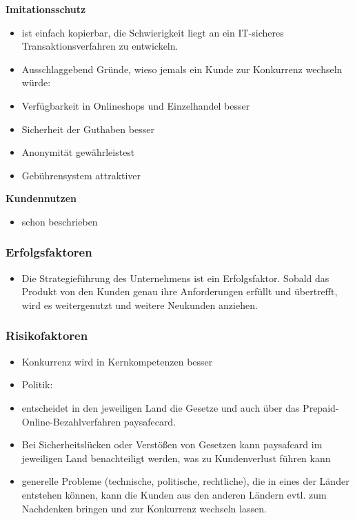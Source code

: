 \textbf{Imitationsschutz}
\begin{itemize}
        \item ist einfach kopierbar, die Schwierigkeit liegt an ein IT-sicheres Transaktionsverfahren zu entwickeln.
        \item Ausschlaggebend Gründe, wieso jemals ein Kunde zur Konkurrenz wechseln würde:
        \item   Verfügbarkeit in Onlineshops und Einzelhandel besser
        \item   Sicherheit der Guthaben besser
        \item   Anonymität gewährleistest
        \item   Gebührensystem attraktiver
\end{itemize}

\textbf{Kundennutzen}
\begin{itemize}
        \item schon beschrieben

\end{itemize}



\subsubsection{Erfolgsfaktoren}
\begin{itemize}
        \item Die Strategieführung des Unternehmens ist ein Erfolgsfaktor. Sobald das Produkt von den Kunden genau ihre Anforderungen erfüllt und übertrefft, wird es weitergenutzt und weitere Neukunden anziehen.
\end{itemize}


\subsubsection{Risikofaktoren}
\begin{itemize}
        \item Konkurrenz wird in Kernkompetenzen besser
        \item Politik:
        \item   entscheidet in den jeweiligen Land die Gesetze und auch über das Prepaid-Online-Bezahlverfahren paysafecard.
        \item   Bei Sicherheitslücken oder Verstößen von Gesetzen kann paysafcard im jeweiligen Land benachteiligt werden, was zu Kundenverlust führen kann
        \item   generelle Probleme (technische, politische, rechtliche), die in eines der Länder entstehen können, kann die Kunden aus den anderen Ländern evtl. zum Nachdenken bringen und zur Konkurrenz wechseln lassen.
\end{itemize}



